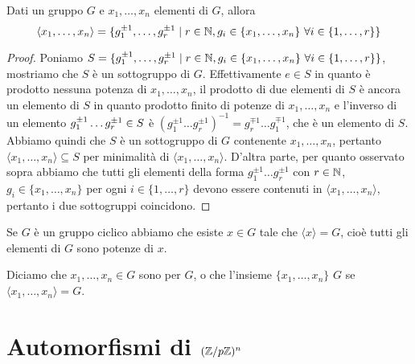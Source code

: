 \documentclass[11pt]{scrartcl}
\begin{document}
\begin{proposition}
\label{prop1.0}
Dati un gruppo $G$ e $x_1, \ldots, x_n$ elementi di $G$, allora \[
    \langle x_1, \ldots, x_n\rangle = \{g_1^{\pm 1}, \ldots, g_r^{\pm 1}\mid r 
    \in \mathbb N, g_i \in \{x_1, \ldots, x_n\}~\forall i \in \{1, \ldots, r\}\}
    \]
\end{proposition}

\begin{proof}
Poniamo $S = \{g_1^{\pm 1}, \ldots, g_r^{\pm 1}\mid r \in \mathbb N, g_i \in \{x_1, \ldots, x_n\}
~\forall i \in \{1, \ldots, r\}\}$, mostriamo che $S$ è un sottogruppo di $G$. 
Effettivamente $e \in S$ in quanto è prodotto nessuna potenza di $x_1, \ldots, x_n$, 
il prodotto di due elementi di $S$ è ancora un elemento di $S$ in quanto
prodotto finito di potenze di $x_1, \ldots, x_n$ e l'inverso di un elemento
$g_1^{\pm 1}\ldots g_r^{\pm 1} \in\nolinebreak S$ è $(g_1^{\pm 1}\ldots 
g_r^{\pm 1})^{-1} = g_r^{\mp 1}\ldots g_1^{\mp 1}$, che è un elemento di $S$.
Abbiamo quindi che $S$ è un sottogruppo di $G$ contenente $x_1, \ldots, x_n$,
pertanto $\langle x_1, \ldots, x_n\rangle\subseteq S$ per minimalità di $\langle x_1,
\ldots, x_n\rangle$. D'altra parte, per quanto osservato sopra abbiamo che
tutti gli elementi della forma $g_1^{\pm 1}\ldots g_r^{\pm 1}$ con $r \in \mathbb N$, 
$g_i \in \{x_1, \ldots, x_n\}$ per ogni $i \in \{1, \ldots, r\}$ devono essere
contenuti in $\langle x_1, \ldots, x_n\rangle$, pertanto i due sottogruppi
coincidono.
\end{proof}

\begin{remark}
    Se $G$ è un gruppo ciclico abbiamo che esiste $x \in G$ tale che 
    $\langle x\rangle = G$, cioè tutti gli elementi di $G$ sono potenze di $x$.
\end{remark}

Diciamo che $x_1, \ldots, x_n \in G$ sono  per $G$, o che 
l'insieme $\{x_1, \ldots, x_n\}$  $G$ se $\langle x_1, \ldots, x_n\rangle = G$.

\newpage

\section{Automorfismi di $({\mathbb Z}/p{\mathbb Z})^n$}
\label{aut sp vet}
\end{document}

